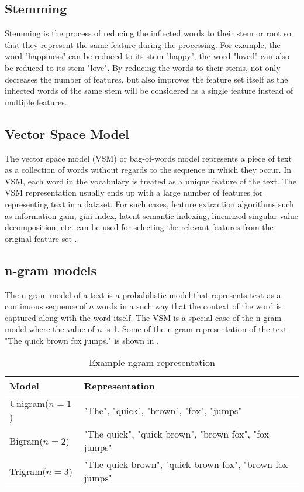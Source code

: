 \subsection{Stemming}
Stemming is the process of reducing the inflected words to their stem or root so that they represent the same feature during the processing. For example, the word "happiness" can be reduced to its stem "happy", the word "loved" can also be reduced to its stem "love". By reducing the words to their stems, not only decreases the number of features, but also improves the feature set itself  as the inflected words of the same stem will be considered as a single feature instead of multiple features. 

\subsection{Vector Space Model}
The vector space model (VSM) or bag-of-words model represents a piece of text as a collection of words without regards to the sequence in which they occur. In VSM, each word in the vocabulary is treated as a unique feature of the text. The VSM representation usually ends up with a large number of features for representing text in a dataset. For such cases, feature extraction algorithms such as information gain, gini index, latent semantic indexing, linearized singular value decomposition, etc. can be used for selecting the relevant features from the original feature set \cite{aggarwal2012survey}.

\subsection{n-gram models}
The n-gram model of a text is a probabilistic model that represents text as a continuous sequence of $n$ words in a such way that the context of the word is captured along with the word itself. The VSM is a special case of the n-gram model where the value of $n$ is 1. Some of the n-gram representation of the text "The quick brown fox jumps." is shown in .

\begin{table}[h]
\begin{center}
\caption{Example ngram representation}
\label{tbl:ngram_representation}
\begin{tabular}{p{3cm}p{8cm}}
\toprule 
Model&Representation\\
\midrule 
Unigram($n=1$)&"The", "quick", "brown", "fox", "jumps" \\
Bigram($n=2$)&"The quick", "quick brown", "brown fox", "fox jumps" \\
Trigram($n=3$)& "The quick brown", "quick brown fox", "brown fox jumps" \\
\bottomrule
\end{tabular}
\end{center}
\end{table}

